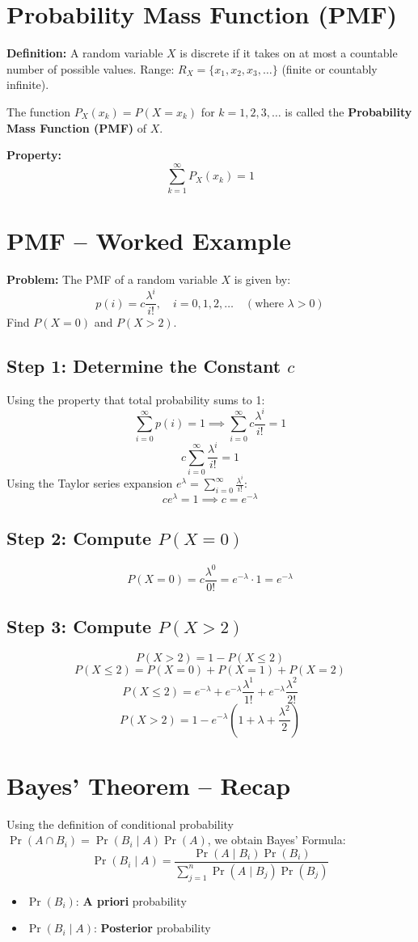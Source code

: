\documentclass[11pt]{article}
\begin{document}
\section{Probability Mass Function (PMF)}
\textbf{Definition:} A random variable $X$ is discrete if it takes on at most a countable number of possible values.
Range: $R_X = \{x_1, x_2, x_3, \dots\}$ (finite or countably infinite).

The function $P_X(x_k) = P(X = x_k)$ for $k = 1,2,3,\dots$ is called the \textbf{Probability Mass Function (PMF)} of $X$.

\textbf{Property:}
\[ \sum_{k=1}^{\infty} P_X(x_k) = 1 \]

\section{PMF – Worked Example}
\textbf{Problem:} The PMF of a random variable $X$ is given by:
\[ p(i) = c \frac{\lambda^i}{i!}, \quad i = 0,1,2,\dots \quad (\text{where } \lambda > 0) \]
Find $P(X=0)$ and $P(X > 2)$.

\subsection*{Step 1: Determine the Constant $c$}
Using the property that total probability sums to 1:
\[ \sum_{i=0}^{\infty} p(i) = 1 \implies \sum_{i=0}^{\infty} c \frac{\lambda^i}{i!} = 1 \]
\[ c \sum_{i=0}^{\infty} \frac{\lambda^i}{i!} = 1 \]
Using the Taylor series expansion $e^{\lambda} = \sum_{i=0}^{\infty} \frac{\lambda^i}{i!}$:
\[ c e^{\lambda} = 1 \implies c = e^{-\lambda} \]

\subsection*{Step 2: Compute $P(X = 0)$}
\[ P(X = 0) = c \frac{\lambda^0}{0!} = e^{-\lambda} \cdot 1 = e^{-\lambda} \]

\subsection*{Step 3: Compute $P(X > 2)$}
\[ P(X > 2) = 1 - P(X \le 2) \]
\[ P(X \le 2) = P(X=0) + P(X=1) + P(X=2) \]
\[ P(X \le 2) = e^{-\lambda} + e^{-\lambda}\frac{\lambda^1}{1!} + e^{-\lambda}\frac{\lambda^2}{2!} \]
\[ P(X > 2) = 1 - e^{-\lambda} \left( 1 + \lambda + \frac{\lambda^2}{2} \right) \]

\section{Bayes’ Theorem – Recap}
Using the definition of conditional probability $\Pr(A \cap B_i) = \Pr(B_i \mid A)\Pr(A)$, we obtain Bayes' Formula:
\[ \Pr(B_i \mid A) = \frac{\Pr(A \mid B_i)\Pr(B_i)}{\sum_{j=1}^{n} \Pr(A \mid B_j)\Pr(B_j)} \]
\begin{itemize}
    \item $\Pr(B_i)$: \textbf{A priori} probability
    \item $\Pr(B_i \mid A)$: \textbf{Posterior} probability
\end{itemize}
\end{document}
